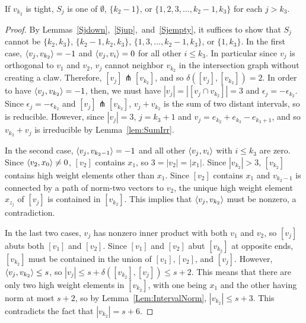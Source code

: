\begin{lemma}\label{lem:tightSj}
If $v_{k_2}$ is tight, $S_j$ is one of $\emptyset$, $\{k_2 - 1\}$, or $\{1,2,3,\dots,k_2 - 1, k_3\}$ for each $j > k_3$. 
\end{lemma}
\begin{proof}
By Lemmas~\ref{Sjdown},~\ref{Sjup},~and~\ref{Sjempty}, it suffices to show that $S_j$ cannot be $\{k_2,k_3\}$, $\{k_2 - 1, k_2, k_3\}$, $\{1,3,\dots,k_2 - 1, k_3\}$, or $\{1,k_3\}$. In the first case, $\left\langle v_j , v_{k_2} \right\rangle = -1$ and $\left\langle v_j , v_i \right\rangle = 0$ for all other $i \le k_3$. In particular since $v_j$ is orthogonal to $v_1$ and $v_2$, $v_j$ cannot neighbor $v_{k_2}$ in the intersection graph without creating a claw. Therefore, $[v_j] \pitchfork [v_{k_2}]$, and so $\delta([v_j],[v_{k_2}]) = 2$. In order to have $\left\langle v_j , v_{k_2} \right\rangle = -1$, then, we must have $|v_j| =|[v_j\cap v_{k_2}]|= 3$ and $\epsilon_j = -\epsilon_{k_2}$. Since $\epsilon_j = -\epsilon_{k_2}$ and $[v_j] \pitchfork [v_{k_2}]$, $v_j + v_{k_2}$ is the sum of two distant intervals, so is reducible. However, since $|v_j| = 3$, $j = k_3 + 1$ and $v_j = e_{k_2} + e_{k_3} - e_{k_3 + 1}$, and so $v_{k_2} + v_j$ is irreducible by Lemma~\ref{lem:SumIrr}.

In the second case, $\left\langle v_j , v_{k_2 - 1} \right\rangle = -1$ and all other $\left\langle v_j , v_i \right\rangle$ with $i \le k_3$ are zero. Since $\left\langle v_2 , x_0 \right\rangle\ne0$, $[v_2]$ contains $x_1$, so $3=|v_2|=|x_1|$.
Since $|v_{k_2}| > 3$, $[v_{k_2}]$ contains high weight elements other than $x_1$. Since $[v_2]$ contains $x_1$ and $v_{k_2 - 1}$ is connected by a path of norm-two vectors to $v_2$, the unique high weight element $x_{z_j}$ of $[v_j]$ is contained in $[v_{k_2}]$. This implies that $\left\langle v_j , v_{k_2} \right\rangle$ must be nonzero, a contradiction. 

In the last two cases, $v_j$ has nonzero inner product with both $v_1$ and $v_2$, so $[v_j]$ abuts both $[v_1]$ and $[v_2]$. Since $[v_1]$ and $[v_2]$ abut $[v_{k_2}]$ at opposite ends, $[v_{k_2}]$ must be contained in the union of $[v_1], [v_2]$, and $[v_j]$. However, $\left\langle v_j , v_{k_2} \right\rangle \le s$, so $|v_j| \le s + \delta([v_{k_2}],[v_j]) \le s+2$. This means that there are only two high weight elements in $[v_{k_2}]$, with one being $x_1$ and the other having norm at most $s+2$, so by Lemma~\ref{Lem:IntervalNorm}, $|v_{k_2}|\le s+3$. This contradicts the fact that $|v_{k_2}| = s+6$. 
\end{proof}

